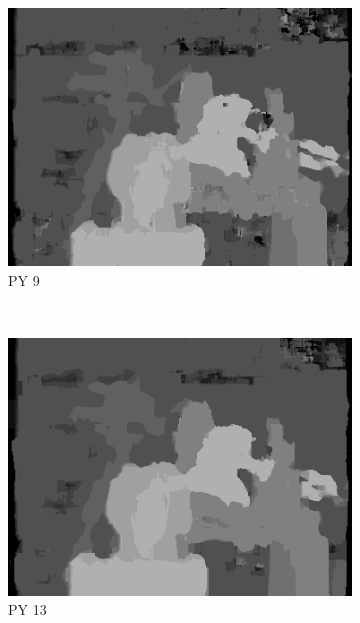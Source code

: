 \begin{figure}
  \begin{subfigure}[b]{0.23\textwidth}
    \centering
    \includegraphics[width=\textwidth]{images/stereo-pairs/tsukuba_pyramid_9.png}
    \caption{PY 9}
  \end{subfigure}
  ~
  \begin{subfigure}[b]{0.23\textwidth}
    \centering
    \includegraphics[width=\textwidth]{images/stereo-pairs/tsukuba_pyramid_13.png}
    \caption{PY 13}
  \end{subfigure}
  ~
  \begin{subfigure}[b]{0.23\textwidth}
    \centering

\end{subfigure}
\end{figure}
